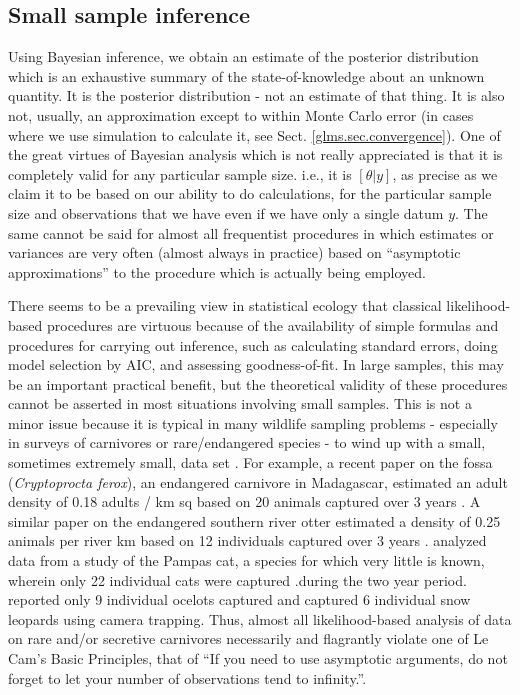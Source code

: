 \subsection{Small sample inference}

Using Bayesian inference, we obtain an estimate of the posterior
distribution which is an exhaustive summary of the state-of-knowledge
about an unknown quantity. It is the posterior distribution - not an
estimate of that thing. It is also not, usually, an approximation
except to within Monte Carlo error (in cases where we use simulation
to calculate it, see Sect. \ref{glms.sec.convergence}).  One of the great virtues of Bayesian analysis which
is not really appreciated is that it is completely valid for any
particular sample size. i.e., it is $[\theta|y]$, as precise as we
claim it to be based on our ability to do calculations, for the
particular sample size and observations that we have even if we have
only a single datum $y$.  The same cannot be said for almost all
frequentist procedures in which estimates or variances are very often
(almost always in practice) based on ``asymptotic approximations'' to
the procedure which is actually being employed.

There seems to be a prevailing view in statistical ecology that
classical likelihood-based procedures are virtuous because of the
availability of simple formulas and procedures for carrying out
inference, such as calculating standard errors, doing model selection
by AIC, and assessing goodness-of-fit.  In large samples, this may be
an important practical benefit, but the theoretical validity of these
procedures cannot be asserted in most situations involving small
samples.  This is not a minor issue because it is typical in many
wildlife sampling problems - especially in surveys of carnivores or
rare/endangered species - to wind up with a small, sometimes extremely
small, data set \citep{foster_harmsen:2012}. For example, a recent paper on the fossa
(\emph{Cryptoprocta ferox}), an endangered carnivore in Madagascar, estimated
an adult density of 0.18 adults / km sq based on 20 animals captured
over 3 years \citep{hawkins_racey:2005}. A similar paper on the
endangered southern river otter estimated a density
of 0.25 animals per river km based on 12 individuals captured over 3
years \citep{sepulveda_etal:2007}. \citet{gardner_etal:2010ecol} analyzed
data from a study of the Pampas cat, a species for which very little
is known, wherein only 22 individual cats were captured .during the
two year period.  \citet{trolle_kery:2005} reported only 9 individual
ocelots captured and \citet{jackson_etal:2006} captured 6 individual
snow leopards using camera trapping. Thus, almost all likelihood-based
analysis of data on rare and/or
secretive carnivores necessarily and flagrantly violate one of Le
Cam's Basic Principles, that of ``If you need to use asymptotic
arguments, do not forget to let your number of observations tend to
infinity.''\citep{lecam:1990}.

